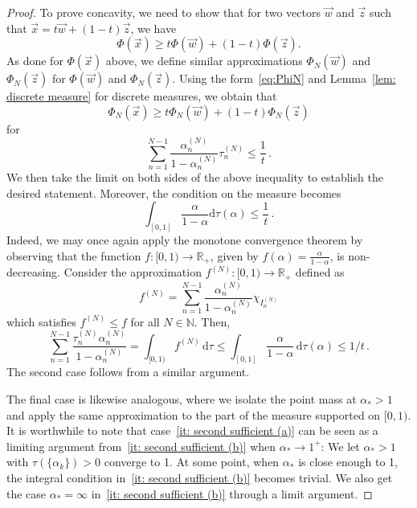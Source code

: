 \documentclass[aps,pra,11pt,onecolumn,nofootinbib,tightenlines]{revtex4-2}
\theoremstyle{definition}
\def \d {\mathrm{d}}
\begin{document}
\begin{proof}
To prove concavity, we need to show that for two vectors $\vec{w}$ and $\vec{z}$ such that
$\vec{x}=t\vec{w}+(1-t)\vec{z}$, we have
\begin{equation}\label{eq:Phiconc}
\Phi(\vec{x})\geq t\Phi(\vec{w})+(1-t)\Phi(\vec{z}).
\end{equation}
As done for $\Phi(\vec{x})$ above, we define similar approximations $\Phi_N(\vec{w})$ and $\Phi_N(\vec{z})$ for $\Phi(\vec{w})$ and $\Phi_N(\vec{z})$. Using the form~\eqref{eq:PhiN} and Lemma~\ref{lem: discrete measure} for discrete measures, we obtain that
\begin{equation}
\Phi_N(\vec{x})\geq t\Phi_N(\vec{w})+(1-t)\Phi_N(\vec{z})
\end{equation}
for 
\begin{equation}
\sum_{n=1}^{N-1}\frac{\alpha^{(N)}_n}{1-\alpha^{(N)}_n}\tau_{n}^{(N)} \leq \frac{1}{t} \,.
\end{equation}
We then take the limit on both sides of the above inequality to establish the desired statement. Moreover, the condition on the measure becomes
\begin{equation}
\int_{[0,1]}\frac{\alpha}{1-\alpha}\d\tau(\alpha) \leq \frac{1}{t} \,.
\end{equation}
Indeed, we may once again apply the monotone convergence theorem by observing that the function $f : [0,1) \to \mathbb{R}_+$, given by $f(\alpha) = \frac{\alpha}{1 - \alpha}$, is non-decreasing. Consider the approximation $f^{(N)} : [0,1) \to \mathbb{R}_+$ defined as
\begin{equation}
    f^{(N)} = \sum_{n=1}^{N-1} \frac{\alpha_n^{(N)}}{1 - \alpha_n^{(N)}} \chi_{I_n^{(N)}} 
\end{equation}
which satisfies $f^{(N)} \leq f$ for all $N \in \mathbb{N}$. Then,
\begin{equation}
    \sum_{n=1}^{N-1} \frac{\tau_n^{(N)} \alpha_n^{(N)}}{1 - \alpha_n^{(N)}} = \int_{[0,1)} f^{(N)} \,\d\tau \leq \int_{[0,1]} \frac{\alpha}{1 - \alpha} \,\d\tau(\alpha) \leq 1/t\,.
\end{equation}
The second case follows from a similar argument. 

The final case is likewise analogous, where we isolate the point mass at $\alpha_* > 1$ and apply the same approximation to the part of the measure supported on $[0,1)$. It is worthwhile to note that case~\ref{it: second sufficient (a)} can be seen as a limiting argument from~\ref{it: second sufficient (b)} when $\alpha_*\to 1^{+}$: We let $\alpha_*>1$ with $\tau(\{\alpha_k\})>0$ converge to 1. At some point, when $\alpha_*$ is close enough to 1, the integral condition in~\ref{it: second sufficient (b)} becomes trivial. We also get the case $\alpha_*=\infty$ in~\ref{it: second sufficient (b)} through a limit argument.
\end{proof}
\end{document}
